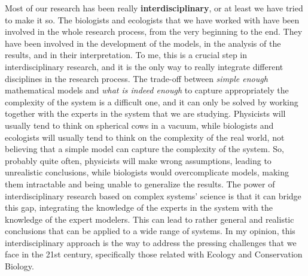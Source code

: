 Most of our research has been really \textbf{interdisciplinary}, or at least
we have tried to make it so. The biologists and ecologists that we have worked
with have been involved in the whole research process, from the very beginning
to the end. They have been involved in the development of the models, in the
analysis of the results, and in their interpretation. To me, this
is a crucial step in interdisciplinary research, and it is the only way to
really integrate different disciplines in the research process. The trade-off
between \textit{simple enough} mathematical models and \textit{what is indeed
    enough} to capture appropriately the complexity of the system is a
difficult one, and it can only be solved by working together with the experts
in the system that we are studying. Physicists will usually tend to think on
spherical cows in a vacuum, while biologists and ecologists will usually tend
to think on the complexity of the real world, not believing that a simple
model can capture the complexity of the system. So, probably quite often,
physicists will make wrong assumptions, leading to unrealistic conclusions,
while biologists would overcomplicate models, making them intractable and being
unable to generalize the results. The power of interdisciplinary research based
on complex systems' science is that it can bridge this gap, integrating the
knowledge of the experts in the system with the knowledge of the expert
modelers. This can lead to rather general and realistic conclusions that can
be applied to a wide range of systems. In my opinion, this interdisciplinary
approach is the way to address the pressing challenges that we face in the 21st
century, specifically those related with Ecology and Conservation Biology.


